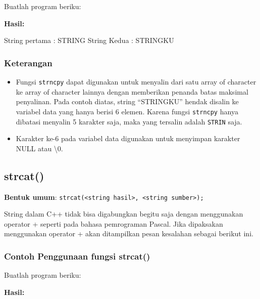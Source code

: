 {{Buatlah program beriku:



\textbf{Hasil:}
\begin{lcverbatim}
 String pertama : STRING
 String Kedua : STRINGKU
\end{lcverbatim}


\subsubsection*{Keterangan}

\begin{itemize}

\item
 Fungsi \texttt{strncpy} dapat digunakan untuk menyalin dari satu array
 of character ke array of character lainnya dengan memberikan penanda
 batas maksimal penyalinan. Pada contoh diatas, string ``STRINGKU''
 hendak disalin ke variabel data yang hanya berisi 6 elemen. Karena
 fungsi \texttt{strncpy} hanya dibatasi menyalin 5 karakter saja, maka
 yang tersalin adalah \texttt{STRIN} saja.
\item
 Karakter ke-6 pada variabel data digunakan untuk menyimpan karakter
 NULL atau \textbackslash0.
\end{itemize}

\subsection{strcat()}\label{strcat}

\textbf{Bentuk umum}:
\texttt{strcat(\textless{}string\ hasil\textgreater{},\ \textless{}string\ sumber\textgreater{});}

String dalam C++ tidak bisa digabungkan begitu saja dengan menggunakan
operator + seperti pada bahasa pemrograman Pascal. Jika dipaksakan
menggunakan operator + akan ditampilkan pesan kesalahan sebagai berikut
ini.

\subsubsection*{Contoh Penggunaan fungsi strcat()}

Buatlah program beriku:



\textbf{Hasil:}

}}

